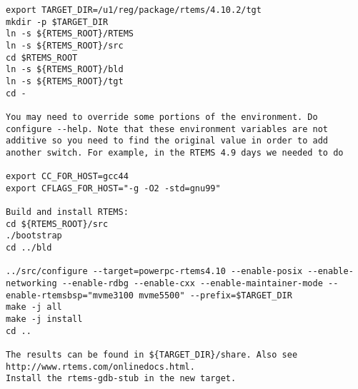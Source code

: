 \documentclass[11pt
  , a4paper
  , article
  , oneside
]{memoir}
\begin{document}
\begin{lstlisting}[style=termstyle]
export TARGET_DIR=/u1/reg/package/rtems/4.10.2/tgt
mkdir -p $TARGET_DIR
ln -s ${RTEMS_ROOT}/RTEMS
ln -s ${RTEMS_ROOT}/src
cd $RTEMS_ROOT
ln -s ${RTEMS_ROOT}/bld
ln -s ${RTEMS_ROOT}/tgt
cd -

You may need to override some portions of the environment. Do configure --help. Note that these environment variables are not additive so you need to find the original value in order to add another switch. For example, in the RTEMS 4.9 days we needed to do

export CC_FOR_HOST=gcc44
export CFLAGS_FOR_HOST="-g -O2 -std=gnu99"

Build and install RTEMS:
cd ${RTEMS_ROOT}/src
./bootstrap
cd ../bld

../src/configure --target=powerpc-rtems4.10 --enable-posix --enable-networking --enable-rdbg --enable-cxx --enable-maintainer-mode --enable-rtemsbsp="mvme3100 mvme5500" --prefix=$TARGET_DIR
make -j all
make -j install
cd ..

The results can be found in ${TARGET_DIR}/share. Also see http://www.rtems.com/onlinedocs.html.
Install the rtems-gdb-stub in the new target.
\end{lstlisting}
\end{document}
